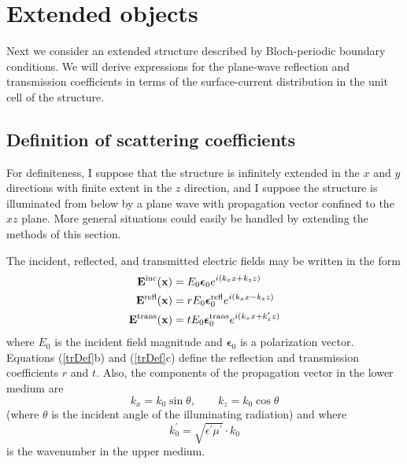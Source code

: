 \documentclass[letterpaper]{article}
\newcommand{\vbEps}{\boldsymbol{\epsilon}}
\begin{document}
\section{Extended objects}

Next we consider an extended structure described by Bloch-periodic
boundary conditions. We will derive expressions for the 
plane-wave reflection and transmission coefficients in terms
of the surface-current distribution in the unit cell of the structure.

\subsection*{Definition of scattering coefficients}

For definiteness, I suppose that the structure is infinitely 
extended in the $x$ and $y$ directions with finite extent in
the $z$ direction, and I suppose the structure is illuminated 
from below by a plane wave with propagation vector confined
to the $xz$ plane. More general situations could easily be 
handled by extending the methods of this section.

The incident, reflected, and transmitted electric fields
may be written in the form
\begin{subequations}
\begin{align}
  \vb E\sups{inc}(\vb x)
&=E_0 \vbEps_0 e^{ i (k_x x + k_z z)}
\\
   \vb E\sups{refl}(\vb x)
&=rE_0 \vbEps_0\sups{refl} e^{ i (k_x x - k_z z)}
\\
  \vb E\sups{trans}(\vb x)
&=tE_0\vbEps_0\sups{trans} e^{ i (k_x x + k_z^\prime z)}
\end{align}
\label{trDef}
\end{subequations}
where $E_0$ is the incident field magnitude and 
$\vbEps_0$ is a polarization vector.
Equations (\ref{trDef}b) and (\ref{trDef}c)
define the reflection and transmission coefficients 
$r$ and $t$. Also, the components of the propagation
vector in the lower medium are 
$$ k_x = k_0\sin\theta, \qquad k_z=k_0\cos\theta$$
(where $\theta$ is the incident angle of the illuminating
radiation) and 
where 
$$ k_0^\prime = \sqrt{\epsilon^\prime \mu^\prime}\cdot k_0$$
is the wavenumber in the upper medium.
\end{document}
